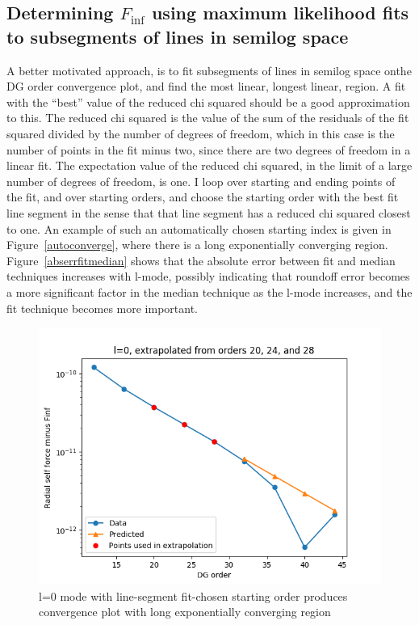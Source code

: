 \subsection{Determining $F_{\inf}$ using maximum likelihood fits to subsegments of lines in semilog space}
A better motivated approach, is to fit subsegments of lines in semilog space onthe DG order convergence plot, and find the most linear, longest linear, region. A fit with the ``best'' value of the reduced chi squared should be a good approximation to this. The reduced chi squared is the value of the sum of the residuals of the fit squared divided by the number of degrees of freedom, which in this case is the number of points in the fit minus two, since there are two degrees of freedom in a linear fit. The expectation value of the reduced chi squared, in the limit of a large number of degrees of freedom, is one. I loop over starting and ending points of the fit, and over starting orders, and choose the starting order with the best fit line segment in the sense that that line segment has a reduced chi squared closest to one. An example of such an automatically chosen starting index is given in Figure~\ref{autoconverge}, where there is a long exponentially converging region. Figure~\ref{abserrfitmedian} shows that the absolute error between fit and median techniques increases with l-mode, possibly indicating that roundoff error becomes a more significant factor in the median technique as the l-mode increases, and the fit technique becomes more important.

\begin{figure}
  \includegraphics{fittingtechniqet370l0}
  \caption{l=0 mode with line-segment fit-chosen starting order produces convergence plot with long exponentially converging region}
\end{figure}



